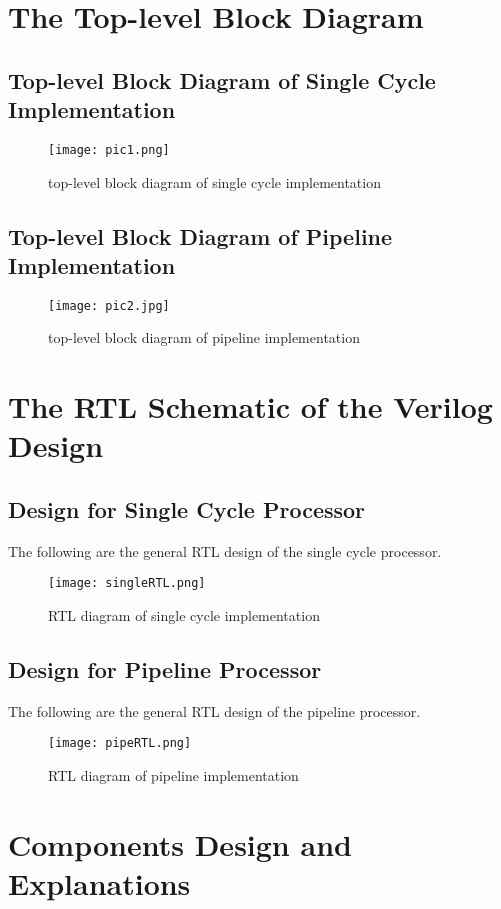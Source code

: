 \documentclass{article}[12pt]
\begin{document}
	\section{The Top-level Block Diagram}
	\subsection{Top-level Block Diagram of Single Cycle Implementation}
	\begin{figure}[H]
		\centering
		\texttt{[image: pic1.png]}
		\caption{top-level block diagram of single cycle implementation}
	\end{figure}
	\subsection{Top-level Block Diagram of Pipeline Implementation}
	\begin{figure}[H]
		\centering
		\texttt{[image: pic2.jpg]}
		\caption{top-level block diagram of pipeline implementation}
	\end{figure}
	
	\section{The RTL Schematic of the Verilog Design}
	\subsection{Design for Single Cycle Processor}
		The following are the general RTL design of the single cycle processor.
		\begin{figure}[H]
			\centering
			\texttt{[image: singleRTL.png]}
			\caption{RTL diagram of single cycle implementation}
		\end{figure}
	\newpage	
	\subsection{Design for Pipeline Processor}
		The following are the general RTL design of the pipeline processor.
		\begin{figure}[H]
			\centering
			\texttt{[image: pipeRTL.png]}
			\caption{RTL diagram of pipeline implementation}
		\end{figure}
	
	\section{Components Design and Explanations}
\end{document}
